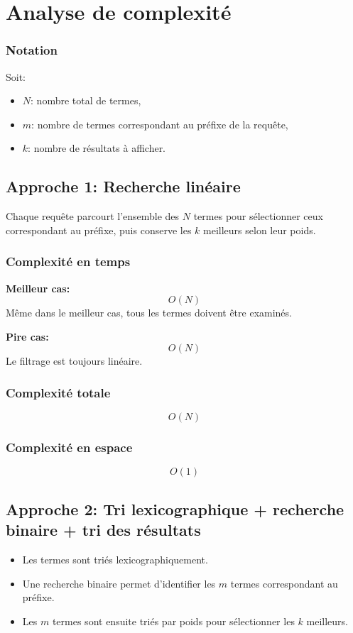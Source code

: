 \section{Analyse de complexité}
\subsubsection{Notation}
Soit:
\begin{itemize}
    \item $N$: nombre total de termes,
    \item $m$: nombre de termes correspondant au préfixe de la requête,
    \item $k$: nombre de résultats à afficher.
\end{itemize}

\subsection{Approche 1: Recherche linéaire}
Chaque requête parcourt l’ensemble des $N$ termes pour sélectionner ceux correspondant au préfixe,
puis conserve les $k$ meilleurs selon leur poids.

\subsubsection{Complexité en temps}
\textbf{Meilleur cas:}
\[
O(N)
\]
Même dans le meilleur cas, tous les termes doivent être examinés.

\textbf{Pire cas:}
\[
O(N)
\]
Le filtrage est toujours linéaire.

\subsubsection{Complexité totale}
\[
O(N)
\]

\subsubsection{Complexité en espace}
\[
O(1)
\]

\subsection{Approche 2: Tri lexicographique + recherche binaire + tri des résultats}
\begin{itemize}
    \item Les termes sont triés lexicographiquement.
    \item Une recherche binaire permet d'identifier les $m$ termes correspondant au préfixe.
    \item Les $m$ termes sont ensuite triés par poids pour sélectionner les $k$ meilleurs.
\end{itemize}

